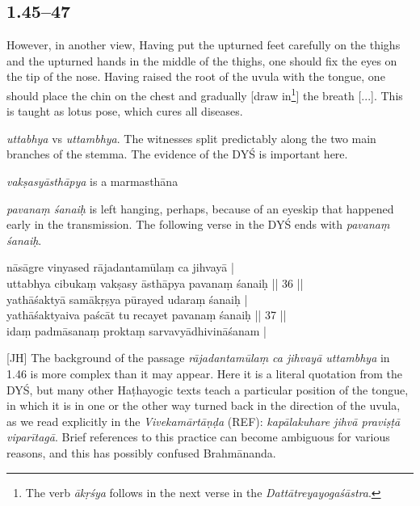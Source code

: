 \begin{ekdosis}
\subsection*{1.45–47}
\begin{translation}[hp01_045]
However, in another view,
Having put the upturned feet carefully on the thighs and the upturned hands in the middle of the thighs, one should fix the eyes on the tip of the nose. Having raised the root of the uvula with the tongue, one should place the chin on the chest and gradually [draw in\footnote{The verb \emph{ākṛśya} follows in the next verse in the \emph{Dattātreyayogaśāstra}.}] the breath [...]. This is taught as lotus pose, which cures all diseases. 
\end{translation}

\begin{philcomm}[hp01_045]
\emph{uttabhya} vs \emph{uttambhya}.
The witnesses split predictably along the two main branches of the stemma. The evidence of the DYŚ is important here.

\emph{vakṣasyāsthāpya} is a marmasthāna


\emph{pavanaṃ śanaiḥ} is left hanging, perhaps, because of an eyeskip that happened early in the transmission. The following verse in the DYŚ ends with \emph{pavanaṃ śanaiḥ}.

\startverse
nāsāgre vinyased rājadantamūlaṃ ca jihvayā |\\
uttabhya cibukaṃ vakṣasy āsthāpya pavanaṃ śanaiḥ || 36 ||\\
yathāśaktyā samākṛṣya pūrayed udaraṃ śanaiḥ |\\
yathāśaktyaiva paścāt tu recayet pavanaṃ śanaiḥ || 37 ||\\
idaṃ padmāsanaṃ proktaṃ sarvavyādhivināśanam |
\endverse

[JH] The background of the passage \emph{rājadantamūlaṃ ca jihvayā uttambhya} in 1.46 is more complex
than it may appear. Here it is a literal quotation from the DYŚ, but many other Haṭhayogic texts
teach a particular position of the tongue, in which it is in one or the other way turned back in
the direction of the uvula, as we read explicitly in the \emph{Vivekamārtāṇḍa} (REF):
\emph{kapālakuhare jihvā praviṣṭā viparītagā}. Brief references to this practice can become
ambiguous for various reasons, and this has possibly confused Brahmānanda. 


\end{philcomm}
\end{ekdosis}
